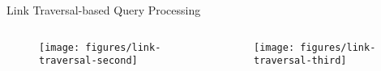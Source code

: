 \begin{frame}{Link Traversal-based Query Processing}
    \begin{columns}[T] %
        \begin{column}{.48\textwidth}

       \begin{figure}
            \centering
            \texttt{[image: figures/link-traversal-second]}
        \end{figure}

        \end{column}%
        \hfill%
        \begin{column}{.48\textwidth}
            \begin{figure}
                \centering
                \texttt{[image: figures/link-traversal-third]}
            \end{figure}
        \end{column}%
    \end{columns}
\end{frame}
